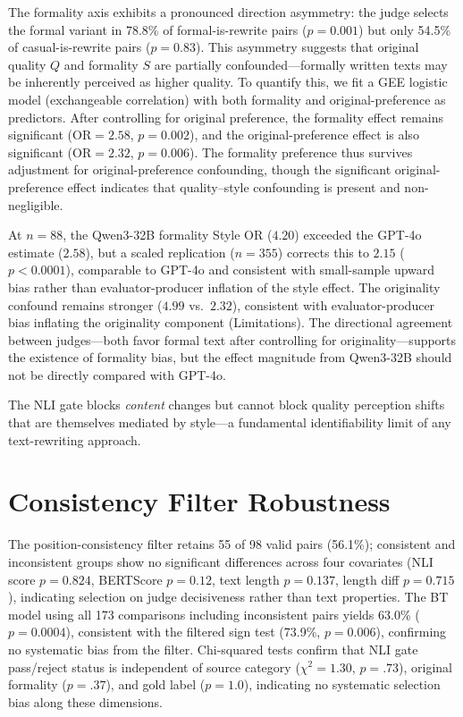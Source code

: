 The formality axis exhibits a pronounced direction asymmetry: the judge selects the formal variant in 78.8\% of formal-is-rewrite pairs ($p = 0.001$) but only 54.5\% of casual-is-rewrite pairs ($p = 0.83$).
This asymmetry suggests that original quality $Q$ and formality $S$ are partially confounded---formally written texts may be inherently perceived as higher quality.
To quantify this, we fit a GEE logistic model (exchangeable correlation) with both formality and original-preference as predictors.
After controlling for original preference, the formality effect remains significant ($\text{OR} = 2.58$, $p = 0.002$), and the original-preference effect is also significant ($\text{OR} = 2.32$, $p = 0.006$).
The formality preference thus survives adjustment for original-preference confounding, though the significant original-preference effect indicates that quality--style confounding is present and non-negligible.

At $n = 88$, the Qwen3-32B formality Style OR ($4.20$) exceeded the GPT-4o estimate ($2.58$), but a scaled replication ($n = 355$) corrects this to $2.15$ ($p < 0.0001$), comparable to GPT-4o and consistent with small-sample upward bias rather than evaluator-producer inflation of the style effect.
The originality confound remains stronger ($4.99$ vs.\ $2.32$), consistent with evaluator-producer bias inflating the originality component (Limitations).
The directional agreement between judges---both favor formal text after controlling for originality---supports the existence of formality bias, but the effect magnitude from Qwen3-32B should not be directly compared with GPT-4o.

The NLI gate blocks \emph{content} changes but cannot block quality perception shifts that are themselves mediated by style---a fundamental identifiability limit of any text-rewriting approach.

\section{Consistency Filter Robustness}
\label{sec:consistency}

The position-consistency filter retains 55 of 98 valid pairs (56.1\%); consistent and inconsistent groups show no significant differences across four covariates (NLI score $p = 0.824$, BERTScore $p = 0.12$, text length $p = 0.137$, length diff $p = 0.715$), indicating selection on judge decisiveness rather than text properties.
The BT model using all 173 comparisons including inconsistent pairs yields 63.0\% ($p = 0.0004$), consistent with the filtered sign test (73.9\%, $p = 0.006$), confirming no systematic bias from the filter.
Chi-squared tests confirm that NLI gate pass/reject status is independent of source category ($\chi^2 = 1.30$, $p = .73$), original formality ($p = .37$), and gold label ($p = 1.0$), indicating no systematic selection bias along these dimensions.

